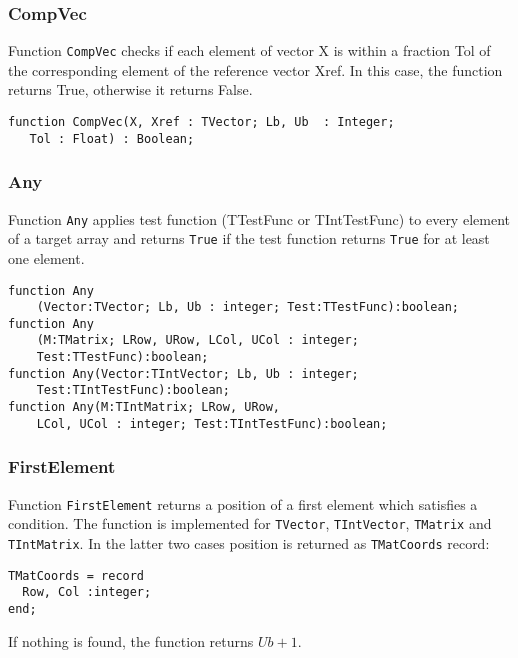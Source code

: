 \documentclass[12pt,a4paper,oneside]{article}
\newcommand{\code}[1]{\texttt{#1}}
\begin{document}
\subsubsection{CompVec}
Function \code{CompVec} checks if each element of vector X is within a fraction Tol of	the corresponding element of the reference vector Xref. In this case, the function returns True, otherwise it returns False.
\begin{verbatim}
function CompVec(X, Xref : TVector; Lb, Ub  : Integer; 
   Tol : Float) : Boolean;
\end{verbatim}
\subsubsection{Any}
Function \code{Any} applies test function (TTestFunc or TIntTestFunc) to every element of a target array and returns \code{True} if the test function returns \code{True} for at least one element. 

\begin{verbatim}
function Any
    (Vector:TVector; Lb, Ub : integer; Test:TTestFunc):boolean;
function Any
    (M:TMatrix; LRow, URow, LCol, UCol : integer; 
    Test:TTestFunc):boolean;
function Any(Vector:TIntVector; Lb, Ub : integer;
    Test:TIntTestFunc):boolean; 
function Any(M:TIntMatrix; LRow, URow, 
    LCol, UCol : integer; Test:TIntTestFunc):boolean; 
\end{verbatim}
\subsubsection{FirstElement}
Function \code{FirstElement} returns a position of a first element which satisfies a condition. The function is implemented for \code{TVector}, \code{TIntVector}, \code{TMatrix} and \code{TIntMatrix}. In the latter two cases position is returned as \code{TMatCoords} record:
\begin{verbatim}
TMatCoords = record
  Row, Col :integer;
end;
\end{verbatim}
If nothing is found, the function returns $Ub+1$.
\end{document}

